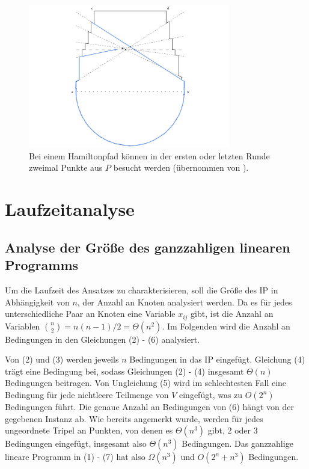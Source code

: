 \documentclass[a4paper, 10pt, ngerman]{article}
\begin{document}
\begin{figure}[h]
    \centering
    \includegraphics[width=250pt]{grafiken/wenigerkrumm-np3.jpg}
    \caption{Bei einem Hamiltonpfad können in der ersten oder letzten Runde zweimal Punkte aus $P$ besucht werden (übernommen von \cite{nphard}).}
\end{figure}

\section{Laufzeitanalyse}

\subsection{Analyse der Größe des ganzzahligen linearen Programms}

Um die Laufzeit des Ansatzes zu charakterisieren, soll die Größe des IP in Abhängigkeit von $n$, der Anzahl an Knoten analysiert werden. Da es für jedes unterschiedliche Paar an Knoten eine Variable $x_{ij}$ gibt, ist die Anzahl an Variablen $\binom n 2 = n(n - 1) / 2 = \Theta(n^2)$. Im Folgenden wird die Anzahl an Bedingungen in den Gleichungen (2) - (6) analysiert.

Von (2) und (3) werden jeweils $n$ Bedingungen in das IP eingefügt. Gleichung (4) trägt eine Bedingung bei, sodass Gleichungen (2) - (4) insgesamt $\Theta(n)$ Bedingungen beitragen. Von Ungleichung (5) wird im schlechtesten Fall eine Bedingung für jede nichtleere Teilmenge von $V$ eingefügt, was zu $O(2^n)$ Bedingungen führt. Die genaue Anzahl an Bedingungen von (6) hängt von der gegebenen Instanz ab. Wie bereits angemerkt wurde, werden für jedes ungeordnete Tripel an Punkten, von denen es $\Theta(n^3)$ gibt, 2 oder 3 Bedingungen eingefügt, insgesamt also $\Theta(n^3)$ Bedingungen. Das ganzzahlige lineare Programm in (1) - (7) hat also $\Omega(n^3)$ und $O(2^n + n^3)$ Bedingungen.
\end{document}
